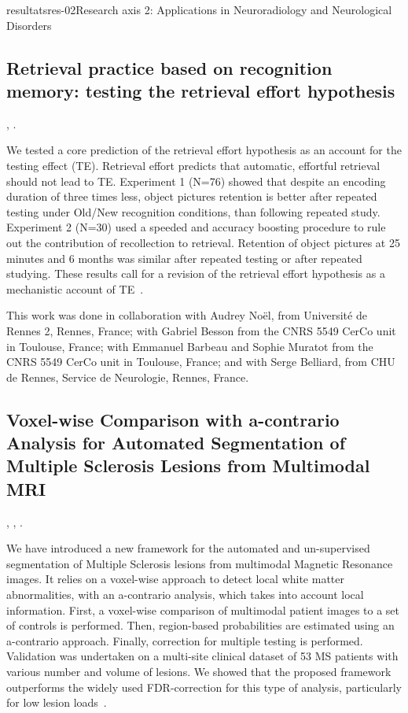 \documentclass{ra2018}
\begin{document}
\begin{module}{resultats}{res-02}{Research axis 2: Applications in Neuroradiology and Neurological Disorders}
\subsection{Retrieval practice based on recognition memory: testing the retrieval effort hypothesis}
\begin{participants}
      ,
      .
\end{participants}
We tested a core prediction of the retrieval effort hypothesis as an account for the testing effect (TE). Retrieval effort predicts that automatic, effortful retrieval should not lead to TE. Experiment 1 (N=76) showed that despite an encoding duration of three times less, object pictures retention is better after repeated testing under Old/New recognition conditions, than following repeated study. Experiment 2 (N=30) used a speeded and accuracy boosting procedure to rule out the contribution of recollection to retrieval. Retention of object pictures at 25 minutes and 6 months was similar after repeated testing or after repeated studying. These results call for a revision of the retrieval effort hypothesis as a mechanistic account of TE~\cite{jonin:inserm-01939069}.

This work was done in collaboration with Audrey Noël, from Université de Rennes 2, Rennes, France; with Gabriel Besson from the CNRS 5549 CerCo unit in Toulouse, France; with Emmanuel Barbeau and Sophie Muratot from the CNRS 5549 CerCo unit in Toulouse, France; and with Serge Belliard, from CHU de Rennes, Service de Neurologie, Rennes, France.


\subsection{Voxel-wise Comparison with a-contrario Analysis for Automated Segmentation of Multiple Sclerosis Lesions from Multimodal MRI}
\begin{participants}
      ,
      ,
      .
\end{participants}
We have introduced a new framework for the automated and un-supervised segmentation of Multiple Sclerosis lesions from multimodal Magnetic Resonance images. It relies on a voxel-wise approach to detect local white matter abnormalities, with an a-contrario analysis, which takes into account local information. First, a voxel-wise comparison of multimodal patient images to a set of controls is performed. Then, region-based probabilities are estimated using an a-contrario approach. Finally, correction for multiple testing is performed. Validation was undertaken on a multi-site clinical dataset of 53 MS patients with various number and volume of lesions. We showed that the proposed framework outperforms the widely used FDR-correction for this type of analysis, particularly for low lesion loads~\cite{galassi:inserm-01888928}.


\end{module}
\end{document}
